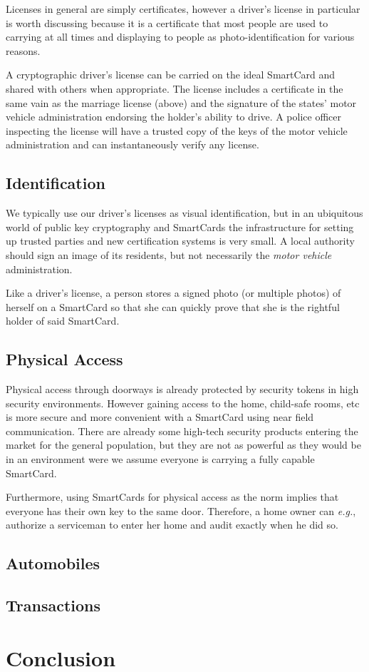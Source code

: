 \documentclass[11pt, twocolumn]{article}
\begin{document}
Licenses in general are simply certificates, however a driver's license
in particular is worth discussing because it is a certificate that most people
are used to carrying at all times and displaying to people as
photo-identification for various reasons.

A cryptographic driver's license can be carried on the ideal SmartCard and
shared with others when appropriate. The license includes a certificate in the
same vain as the marriage license (above) and the signature of the states' motor
vehicle administration endorsing the holder's ability to drive. A police officer
inspecting the license will have a trusted copy of the keys of the motor vehicle
administration and can instantaneously verify any license.

\subsection{Identification}

We typically use our driver's licenses as visual identification, but in an
ubiquitous world of public key cryptography and SmartCards the infrastructure
for setting up trusted parties and new certification systems is very small. A
local authority should sign an image of its residents, but not necessarily the
\textit{motor vehicle} administration.

Like a driver's license, a person stores a signed photo (or multiple photos) of
herself on a SmartCard so that she can quickly prove that she is the rightful
holder of said SmartCard.

\subsection{Physical Access}

Physical access through doorways is already protected by security tokens in high
security environments. However gaining access to the home, child-safe rooms, etc
is more secure and more convenient with a SmartCard using near field
communication. There are already some high-tech security products entering the
market for the general population, but they are not as powerful as they would be
in an environment were we assume everyone is carrying a fully capable SmartCard.

Furthermore, using SmartCards for physical access as the norm implies that
everyone has their own key to the same door. Therefore, a home owner can
\textit{e.g.}, authorize a serviceman to enter her home and audit exactly when
he did so.

\subsection{Automobiles}

\subsection{Transactions}

\section{Conclusion}
\label{sec:conclusion}


\nocite{*}

\end{document}
